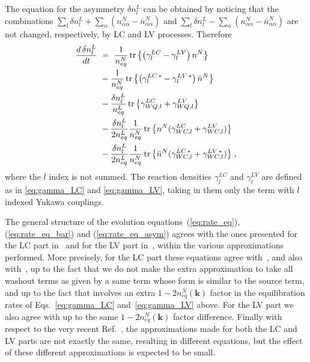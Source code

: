 \documentclass[prd,twocolumn,superscriptaddress,preprintnumbers,nofootinbib,
noshowpacs,groupedaddress]{revtex4-1} %
\DeclareMathOperator{\tr}{tr}
\newcommand{\ve}[1]{\mathbf{#1}}
\begin{document}
The equation for the asymmetry $\delta n^L_l$ can be obtained by noticing that the combinations $\sum_l \delta n^L_l + \sum_\alpha (n^N_{\alpha \alpha}-\bar n^N_{\alpha \alpha})$ and $\sum_l \delta n^L_l - \sum_\alpha (n^N_{\alpha \alpha}-\bar n^N_{\alpha \alpha})$ are not changed, respectively, by LC and LV processes. Therefore
\begin{align}\label{eq:rate_eq_asym}
\frac{d \, \delta n^L_{l}}{d t}  \ &= \ \frac{1}{n^N_{eq}} \tr \big\{\big( \gamma^{LC}_l - \gamma^{LV}_l \big) \, n^N \big\} \notag\\
&- \frac{1}{n^N_{eq}} \tr \big\{\big( \gamma^{LC \,*}_l - \gamma^{LV \,*}_l \big) \, \bar n^N \big\} \notag \\
&- \frac{\delta n^L_l}{n^L_{eq}} \tr \big\{ \gamma^{LC}_{WQ,l} + \gamma^{LV}_{WQ,l}\big\} \notag\\
& - \frac{\delta n^L_l}{2 n^L_{eq}} \frac{1}{n^N_{eq}} \tr \big\{n^N (\gamma^{LC}_{WC,l} + \gamma^{LV}_{WC,l}) \big\} \notag \\
& - \frac{\delta n^L_l}{2 n^L_{eq}} \frac{1}{n^N_{eq}} \tr \big\{ \bar n^N (\gamma^{LC \,*}_{WC,l} + \gamma^{LV \, *}_{WC,l})\big\} \;,
\end{align}
where the $l$ index is not summed. The reaction densities $\gamma^{LC}_l$ and $\gamma^{LV}_l$ are defined as in \eqref{eq:gamma_LC} and \eqref{eq:gamma_LV}, taking in them only the term with $l$ indexed Yukawa couplings.

The general structure of the evolution equations~(\ref{eq:rate_eq}), (\ref{eq:rate_eq_bar}) and (\ref{eq:rate_eq_asym}) agrees with the ones presented for the LC part in~\cite{Canetti:2012kh, Drewes:2016gmt, Hernandez:2016kel, Ghiglieri:2017gjz} and for the LV part in~\cite{Canetti:2012kh,Ghiglieri:2017gjz}, within the various approximations performed. More precisely, for the LC part these equations agree with~\cite{Hernandez:2016kel}, and also with~\cite{Canetti:2012kh, Drewes:2016gmt}, up to the fact that we do not make the extra approximation to take all washout terms as given by a same term whose form is similar to the source term, and up to the fact that \cite{Canetti:2012kh} involves an extra $1-2 n^N_{eq}(\ve k)$ factor in the equilibration rates of Eqs.~\eqref{eq:gamma_LC} and~\eqref{eq:gamma_LV} above. For the LV part we also agree with \cite{Canetti:2012kh} up to the same $1-2 n^N_{eq}(\ve k)$ factor difference. Finally with respect to the very recent Ref.~\cite{Ghiglieri:2017gjz}, the approximations made for both the LC and LV parts are not exactly the same, resulting in different equations, but the effect of these different approximations is expected to be small. 
\end{document}
